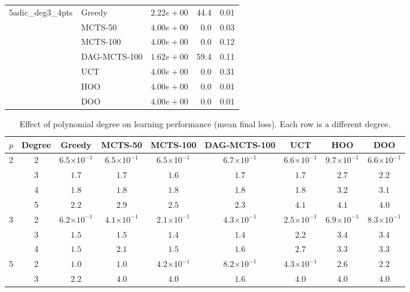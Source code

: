 \begin{table}[ht]
\begin{tabular}{llrrr}
\midrule
5adic\_deg3\_4pts & Greedy & $2.22e+00$ & 44.4 & 0.01 \\
 & MCTS-50 & $4.00e+00$ & 0.0 & 0.03 \\
 & MCTS-100 & $4.00e+00$ & 0.0 & 0.12 \\
 & DAG-MCTS-100 & $1.62e+00$ & 59.4 & 0.11 \\
 & UCT & $4.00e+00$ & 0.0 & 0.31 \\
 & HOO & $4.00e+00$ & 0.0 & 0.01 \\
 & DOO & $4.00e+00$ & 0.0 & 0.01 \\
\bottomrule
\end{tabular}
\end{table}


\begin{table}[ht]
\centering
\caption{Effect of polynomial degree on learning performance (mean final loss). Each row is a different degree.}
\label{tab:poly-learning-degree}
\begin{tabular}{ccccccccc}
\toprule
$p$ & Degree & Greedy & MCTS-50 & MCTS-100 & DAG-MCTS-100 & UCT & HOO & DOO \\
\midrule
2 & 2 & $6.5{\scriptstyle\times 10^{-1}}$ & $6.5{\scriptstyle\times 10^{-1}}$ & $6.5{\scriptstyle\times 10^{-1}}$ & $6.7{\scriptstyle\times 10^{-1}}$ & $6.6{\scriptstyle\times 10^{-1}}$ & $9.7{\scriptstyle\times 10^{-1}}$ & $6.6{\scriptstyle\times 10^{-1}}$ \\
 & 3 & $1.7$ & $1.7$ & $1.6$ & $1.7$ & $1.7$ & $2.7$ & $2.2$ \\
 & 4 & $1.8$ & $1.8$ & $1.8$ & $1.8$ & $1.8$ & $3.2$ & $3.1$ \\
 & 5 & $2.2$ & $2.9$ & $2.5$ & $2.3$ & $4.1$ & $4.1$ & $4.0$ \\
\midrule
3 & 2 & $6.2{\scriptstyle\times 10^{-1}}$ & $4.1{\scriptstyle\times 10^{-1}}$ & $2.1{\scriptstyle\times 10^{-1}}$ & $4.3{\scriptstyle\times 10^{-1}}$ & $2.5{\scriptstyle\times 10^{-1}}$ & $6.9{\scriptstyle\times 10^{-1}}$ & $8.3{\scriptstyle\times 10^{-1}}$ \\
 & 3 & $1.5$ & $1.5$ & $1.4$ & $1.4$ & $2.2$ & $3.4$ & $3.4$ \\
 & 4 & $1.5$ & $2.1$ & $1.5$ & $1.6$ & $2.7$ & $3.3$ & $3.3$ \\
\midrule
5 & 2 & $1.0$ & $1.0$ & $4.2{\scriptstyle\times 10^{-1}}$ & $8.2{\scriptstyle\times 10^{-1}}$ & $4.3{\scriptstyle\times 10^{-1}}$ & $2.6$ & $2.2$ \\
 & 3 & $2.2$ & $4.0$ & $4.0$ & $1.6$ & $4.0$ & $4.0$ & $4.0$ \\
\bottomrule
\end{tabular}
\end{table}


